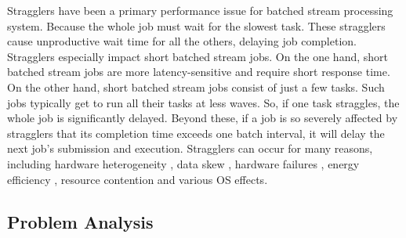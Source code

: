   Stragglers have been a primary performance issue for batched stream processing system. Because the whole job must wait for the slowest task. These stragglers cause unproductive wait time for all the others, delaying job completion. Stragglers especially impact short batched stream jobs. On the one hand, short batched stream jobs are more latency-sensitive and require short response time. On the other hand, short batched stream jobs consist of just a few tasks. Such jobs typically get to run all their tasks at less waves. So, if one task straggles, the whole job is significantly delayed. Beyond these, if a job is so severely affected by stragglers that its completion time exceeds one batch interval, it will delay the next job's submission and execution. Stragglers can occur for many reasons, including hardware heterogeneity \cite{Reiss2012}, data skew \cite{Kwon2012}, hardware failures \cite{Ananthanarayanan2010}, energy efficiency \cite{Cheng2015}, resource contention and various OS effects.

\subsection{Problem Analysis}

